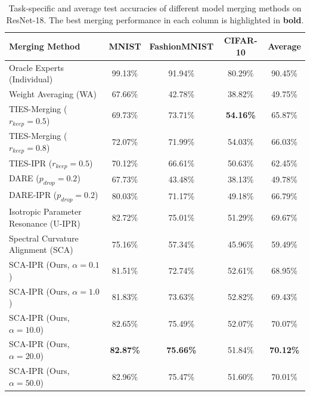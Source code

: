 \documentclass{article}
\theoremstyle{plain}
\theoremstyle{definition}
\theoremstyle{remark}
\begin{document}
\begin{table}[t]
\caption{Task-specific and average test accuracies of different model merging methods on ResNet-18. The best merging performance in each column is highlighted in \textbf{bold}.}
\label{tab:main_results}
\vskip 0.15in
\begin{center}
\begin{small}
\begin{sc}
\begin{tabular}{lcccc}
\toprule
Merging Method & MNIST & FashionMNIST & CIFAR-10 & Average \\
\midrule
Oracle Experts (Individual) & 99.13\% & 91.94\% & 80.29\% & 90.45\% \\
\midrule
Weight Averaging (WA) & 67.66\% & 42.78\% & 38.82\% & 49.75\% \\
TIES-Merging ($r_{keep}=0.5$) \cite{yadav2023ties} & 69.73\% & 73.71\% & \textbf{54.16\%} & 65.87\% \\
TIES-Merging ($r_{keep}=0.8$) \cite{yadav2023ties} & 72.07\% & 71.99\% & 54.03\% & 66.03\% \\
TIES-IPR ($r_{keep}=0.5$) & 70.12\% & 66.61\% & 50.63\% & 62.45\% \\
DARE ($p_{drop}=0.2$) \cite{yu2023language} & 67.73\% & 43.48\% & 38.13\% & 49.78\% \\
DARE-IPR ($p_{drop}=0.2$) & 80.03\% & 71.17\% & 49.18\% & 66.79\% \\
Isotropic Parameter Resonance (U-IPR) \cite{sub9_ipr} & 82.72\% & 75.01\% & 51.29\% & 69.67\% \\
Spectral Curvature Alignment (SCA) & 75.16\% & 57.34\% & 45.96\% & 59.49\% \\
\midrule
SCA-IPR (Ours, $\alpha=0.1$) & 81.51\% & 72.74\% & 52.61\% & 68.95\% \\
SCA-IPR (Ours, $\alpha=1.0$) & 81.83\% & 73.63\% & 52.82\% & 69.43\% \\
SCA-IPR (Ours, $\alpha=10.0$) & 82.65\% & 75.49\% & 52.07\% & 70.07\% \\
SCA-IPR (Ours, $\alpha=20.0$) & \textbf{82.87\%} & \textbf{75.66\%} & 51.84\% & \textbf{70.12\%} \\
SCA-IPR (Ours, $\alpha=50.0$) & 82.96\% & 75.47\% & 51.60\% & 70.01\% \\
\bottomrule
\end{tabular}
\end{sc}
\end{small}
\end{center}
\vskip -0.1in
\end{table}
\end{document}
